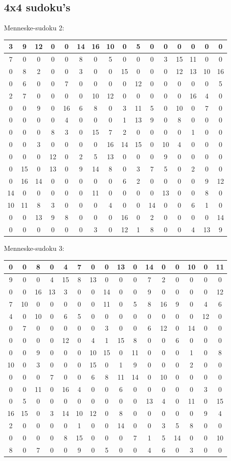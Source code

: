 \documentclass[]{report}
\begin{document}
\subsection{4x4 sudoku's}
Menneske-sudoku 2:
\begin{tabular}{|c|c|c|c||c|c|c|c||c|c|c|c||c|c|c|c}
\hline
3&9&12&0&0&14&16&10&0&5&0&0&0&0&0&0\\\hline
7&0&0&0&0&8&0&5&0&0&0&3&15&11&0&0\\\hline
0&8&2&0&0&3&0&0&15&0&0&0&12&13&10&16\\\hline
0&6&0&0&7&0&0&0&0&12&0&0&0&0&0&5\\\hline\hline
2&7&0&0&0&0&10&12&0&0&0&0&0&16&4&0\\\hline
0&0&9&0&16&6&8&0&3&11&5&0&10&0&7&0\\\hline
0&0&0&0&4&0&0&0&1&13&9&0&8&0&0&0\\\hline
0&0&0&8&3&0&15&7&2&0&0&0&0&1&0&0\\\hline\hline
0&0&3&0&0&0&0&16&14&15&0&10&4&0&0&0\\\hline
0&0&0&12&0&2&5&13&0&0&0&9&0&0&0&0\\\hline
0&15&0&13&0&9&14&8&0&3&7&5&0&2&0&0\\\hline
0&16&14&0&0&0&0&0&6&2&0&0&0&0&9&12\\\hline\hline
14&0&0&0&0&0&11&0&0&0&0&13&0&0&8&0\\\hline
10&11&8&3&0&0&0&4&0&0&14&0&0&6&1&0\\\hline
0&0&13&9&8&0&0&0&16&0&2&0&0&0&0&14\\\hline
0&0&0&0&0&0&3&0&12&1&8&0&0&4&13&9\\\hline
\end{tabular}

Menneske-sudoku 3:
\begin{tabular}{|c|c|c|c||c|c|c|c||c|c|c|c||c|c|c|c}
\hline
0&0&8&0&4&7&0&0&13&0&14&0&0&10&0&11\\\hline
9&0&0&4&15&8&13&0&0&0&7&2&0&0&0&0\\\hline
0&0&16&13&3&0&0&14&0&0&9&0&0&0&0&12\\\hline
7&10&0&0&0&0&0&11&0&5&8&16&9&0&4&6\\\hline\hline
4&0&10&0&6&5&0&0&0&0&0&0&0&0&12&0\\\hline
0&7&0&0&0&0&0&3&0&0&6&12&0&14&0&0\\\hline
0&0&0&0&12&0&4&1&15&8&0&0&6&0&0&0\\\hline
0&0&9&0&0&0&10&15&0&11&0&0&0&1&0&8\\\hline\hline
10&0&3&0&0&0&15&0&1&9&0&0&0&2&0&0\\\hline
0&0&0&7&0&0&6&8&11&14&0&10&0&0&0&0\\\hline
0&0&11&0&16&4&0&0&6&0&0&0&0&0&3&0\\\hline
0&5&0&0&0&0&0&0&0&0&13&4&0&11&0&15\\\hline\hline
16&15&0&3&14&10&12&0&8&0&0&0&0&0&9&4\\\hline
2&0&0&0&0&1&0&0&14&0&0&3&5&8&0&0\\\hline
0&0&0&0&8&15&0&0&0&7&1&5&14&0&0&10\\\hline
8&0&7&0&0&9&0&5&0&0&4&6&0&3&0&0\\\hline
\end{tabular}
\end{document}
